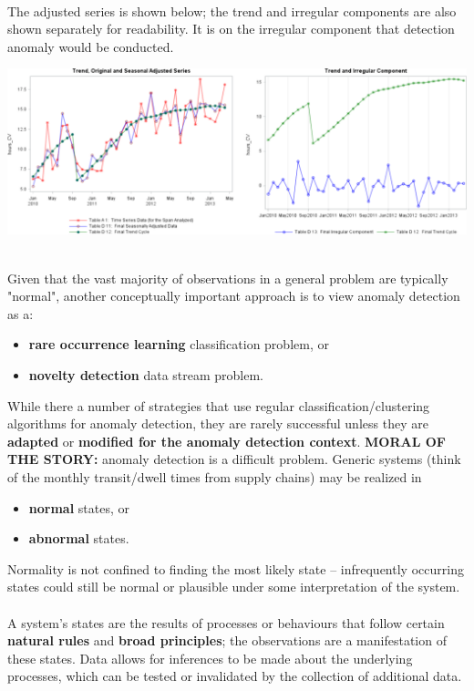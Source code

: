 \documentclass[20pt,landscape,footrule,headrule]{foils}
\newcommand{\newl}{\newline\newline}
\def\fh{\foilhead}
\begin{document}
\newpage \ \\ \noindent The adjusted series is shown below; the trend and irregular components are also shown separately for readability. \newl It is on the irregular component that detection anomaly would be conducted. 
\begin{center}
\includegraphics[width=\textwidth]{Images/adjustedplot.png}\end{center} 
\newpage\ \\ \noindent Given that the vast majority of observations in a general problem are typically "normal", another conceptually important approach is to view anomaly detection as a:
\begin{itemize}
\item \textbf{rare occurrence learning} classification problem, or \item  \textbf{novelty detection} data stream problem. \end{itemize} 
While there a number of strategies that use regular classification/clustering algorithms for anomaly detection, they are rarely successful unless they are \textbf{adapted} or \textbf{modified for the anomaly detection context}.
\newl \textbf{MORAL OF THE STORY:} anomaly detection is a difficult problem.
\fh{Basic Concepts}
\noindent Generic systems (think of the monthly transit/dwell times from supply chains) may be realized in 
\begin{itemize}
\item \textbf{normal} states, or  \item \textbf{abnormal} states. 
\end{itemize} 
Normality is not confined to finding the most likely state -- infrequently occurring states could still be normal or plausible under some interpretation of the system. \newpage\ \\ \noindent A system's states are the results of processes or behaviours that follow certain \textbf{natural rules} and \textbf{broad principles}; the observations are a manifestation of these states. \newl Data allows for inferences to be made about the underlying processes, which can be tested or invalidated by the collection of additional data. 
\end{document}
